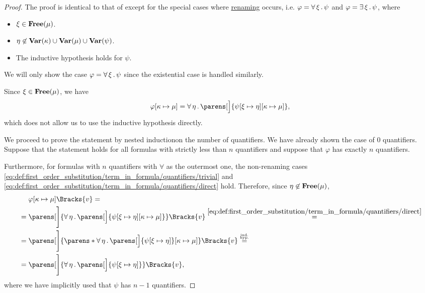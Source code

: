 \begin{proof}
   The proof is identical to that of  except for the special cases where \hyperref[rem:first_order_substitution_renaming_justification]{renaming} occurs, i.e. \( \varphi = \forall \thinspace \xi \thinspace . \thinspace \psi \) and \( \varphi = \exists \thinspace \xi \thinspace . \thinspace \psi \), where
  \begin{itemize}
    \item \( \xi \in \operatorname{\mathbf{Free}}(\mu) \).
    \item \( \eta \not\in \operatorname{\mathbf{Var}}(\kappa) \cup \operatorname{\mathbf{Var}}(\mu) \cup \operatorname{\mathbf{Var}}(\psi) \).
    \item The inductive hypothesis holds for \( \psi \).
  \end{itemize}

  We will only show the case \( \varphi = \forall \thinspace \xi \thinspace . \thinspace \psi \) since the existential case is handled similarly.

  Since \( \xi \in \operatorname{\mathbf{Free}}(\mu) \), we have
  \begin{equation*}
    \varphi[\kappa \mapsto \mu]
    =
    \qforall \eta \parens[\Big]{ \psi[\xi \mapsto \eta][\kappa \mapsto \mu] },
  \end{equation*}
  which does not allow us to use the inductive hypothesis directly.

  We proceed to prove the statement by nested induction\IND on the number of quantifiers. We have already shown the case of \( 0 \) quantifiers. Suppose that the statement holds for all formulas with strictly less than \( n \) quantifiers and suppose that \( \varphi \) has exactly \( n \) quantifiers.

  Furthermore, for formulas with \( n \) quantifiers with \( \forall \) as the outermost one, the non-renaming cases \eqref{eq:def:first_order_substitution/term_in_formula/quantifiers/trivial} and \eqref{eq:def:first_order_substitution/term_in_formula/quantifiers/direct} hold. Therefore, since \( \eta \not\in \operatorname{\mathbf{Free}}(\mu) \),
  \begin{equation}\label{eq:thm:first_order_substitution_equivalence/term_in_formula/nested_induction}
    \begin{aligned}
      &\phantom{{}={}}
      \varphi[\kappa \mapsto \mu]\Bracks{v}
      = \\ &=
      \parens[\Bigg]{\qforall \eta \parens[\Big]{ \psi[\xi \mapsto \eta][\kappa \mapsto \mu] }}\Bracks{v}
      \overset {\eqref{eq:def:first_order_substitution/term_in_formula/quantifiers/direct}} = \\ &=
      \parens[\Bigg]{ \parens*{ \qforall \eta \parens[\Big]{ \psi[\xi \mapsto \eta] } }[\kappa \mapsto \mu] }\Bracks{v}
      \overset {\IndHyp} = \\ &=
      \parens[\Bigg]{\qforall \eta \parens[\Big]{ \psi[\xi \mapsto \eta] } }\Bracks{v},
    \end{aligned}
  \end{equation}
  where we have implicitly used that \( \psi \) has \( n - 1 \) quantifiers.


\end{proof}
